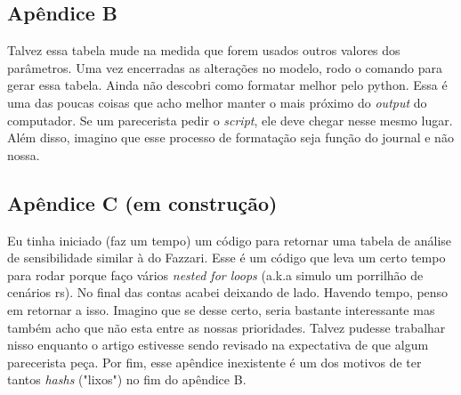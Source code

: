 \documentclass[11pt]{article}
\begin{document}
\subsection{Apêndice B}
\label{sec:orgea96fff}

Talvez essa tabela mude na medida que forem usados outros valores dos parâmetros. Uma vez encerradas as alterações no modelo, rodo o comando para gerar essa tabela. Ainda não descobri como formatar melhor pelo python. Essa é uma das poucas coisas que acho melhor manter o mais próximo do \emph{output} do computador. Se um parecerista pedir o \emph{script}, ele deve chegar nesse mesmo lugar. Além disso, imagino que esse processo de formatação seja função do journal e não nossa.

\subsection{Apêndice C (em construção)}
\label{sec:org172efcf}

Eu tinha iniciado (faz um tempo) um código para retornar uma tabela de análise de sensibilidade similar à do Fazzari. Esse é um código que leva um certo tempo para rodar porque faço vários \emph{nested for loops} (a.k.a simulo um porrilhão de cenários rs). No final das contas acabei deixando de lado. Havendo tempo, penso em retornar a isso. Imagino que se desse certo, seria bastante interessante mas também acho que não esta entre as nossas prioridades. Talvez pudesse trabalhar nisso enquanto o artigo estivesse sendo revisado na expectativa de que algum parecerista peça. Por fim, esse apêndice inexistente é um dos motivos de ter tantos \emph{hashs} ("lixos") no fim do apêndice B.
\end{document}
